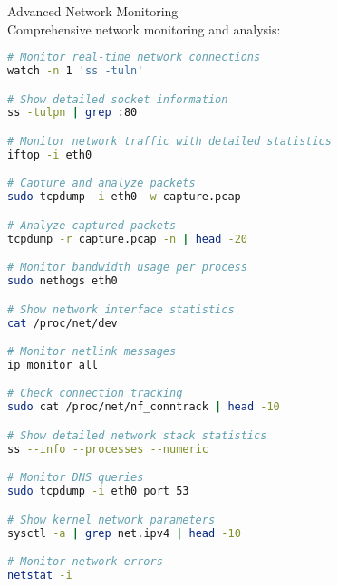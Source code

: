 \begin{example2}{Advanced Network Monitoring}\\
    Comprehensive network monitoring and analysis:
    
\begin{lstlisting}[language=bash, style=basesmol]
# Monitor real-time network connections
watch -n 1 'ss -tuln'

# Show detailed socket information
ss -tulpn | grep :80

# Monitor network traffic with detailed statistics
iftop -i eth0

# Capture and analyze packets
sudo tcpdump -i eth0 -w capture.pcap

# Analyze captured packets
tcpdump -r capture.pcap -n | head -20

# Monitor bandwidth usage per process
sudo nethogs eth0

# Show network interface statistics
cat /proc/net/dev

# Monitor netlink messages
ip monitor all

# Check connection tracking
sudo cat /proc/net/nf_conntrack | head -10

# Show detailed network stack statistics
ss --info --processes --numeric

# Monitor DNS queries
sudo tcpdump -i eth0 port 53

# Show kernel network parameters
sysctl -a | grep net.ipv4 | head -10

# Monitor network errors
netstat -i
\end{lstlisting}
\end{example2}

